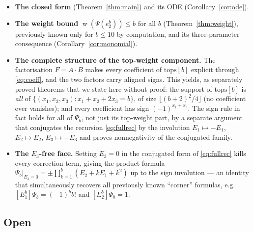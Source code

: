 \documentclass[10pt]{article}
\theoremstyle{plain}
\theoremstyle{definition}
\newcommand{\wt}{\operatorname{w}}
\begin{document}
\begin{itemize}
\item \textbf{The closed form} (Theorem~\ref{thm:main}) and its ODE
(Corollary~\ref{cor:ode}).
\item \textbf{The weight bound} $\wt(\Psi(e_2^b))\le b$ for all $b$
(Theorem~\ref{thm:weight}), previously known only for $b\le10$ by computation, and its
three-parameter consequence (Corollary~\ref{cor:monomial}).
\item \textbf{The complete structure of the top-weight component.} The factorisation
$F=A\cdot B$ makes every coefficient of $\mathrm{tops}[b]$ explicit through
\eqref{eq:coeff}, and the two factors carry aligned signs. This yields, as separately
proved theorems that we state here without proof: the support of $\mathrm{tops}[b]$ is
\emph{all} of $\{(x_1,x_2,x_3):x_1+x_2+2x_3=b\}$, of size $\lfloor(b+2)^2/4\rfloor$ (no
coefficient ever vanishes); and every coefficient has sign $(-1)^{x_1+x_3}$. The sign rule
in fact holds for all of $\Psi_b$, not just its top-weight part, by a separate argument that
conjugates the recursion \eqref{eq:fullrec} by the involution $E_1\mapsto-E_1$,
$E_2\mapsto E_2$, $E_3\mapsto-E_3$ and proves nonnegativity of the conjugated family.
\item \textbf{The $E_3$-free face.} Setting $E_3=0$ in the conjugated form of
\eqref{eq:fullrec} kills every correction term, giving the product formula
$\Psi_b|_{E_3=0}=\pm\prod_{k=1}^{b}(E_2+kE_1+k^2)$ up to the sign involution --- an
identity that simultaneously recovers all previously known ``corner'' formulas, e.g.
$[E_1^b]\Psi_b=(-1)^bb!$ and $[E_2^b]\Psi_b=1$.
\end{itemize}

\subsection{Open}
\end{document}
